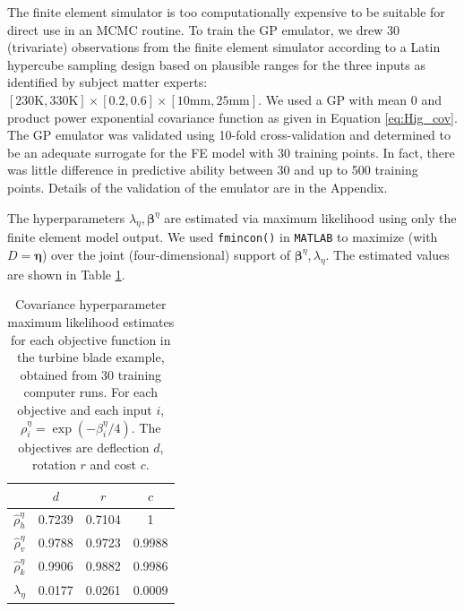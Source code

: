 \documentclass[twocolumn,10pt]{asme2ej}
\begin{document}
The finite element simulator is too computationally expensive to be suitable for direct use in an MCMC routine. 
%
To train the GP emulator, we drew 30 (trivariate) observations from the finite element simulator according to a Latin hypercube sampling design \cite{McKay1979} based on plausible ranges for the three inputs as identified by subject matter experts: $[230\mathrm{K}, 330\mathrm{K}] \times [0.2, 0.6]\times[10\mathrm{mm},25\mathrm{mm}]$.
%
We used a GP with mean 0 and product power exponential covariance function as given in Equation \eqref{eq:Hig_cov}.
%
The GP emulator was validated using 10-fold cross-validation and determined to be an adequate surrogate for the FE model with 30 training points. In fact, there was little difference in predictive ability between 30 and up to 500 training points. Details of the validation of the emulator are in the Appendix.
%
%

%
The hyperparameters $\lambda_\eta,\boldsymbol \beta^\eta$ are estimated %
% 
via maximum likelihood using only the finite element model output.
% 
%
We used \texttt{fmincon()} in \texttt{MATLAB} \cite{MATLAB2017} %
to maximize (with $D=\boldsymbol\eta$) over the joint (four-dimensional) support of $\boldsymbol \beta^\eta,\lambda_\eta$.  
%
The estimated values are shown in Table \ref{table:mles}.
%
\begin{table}[h]
	\renewcommand{\arraystretch}{1.2}
	\begin{center}
		\begin{tabular}{|c|c|c|c|}
			\hline 
			& $d$ & $r$ & $c$ \\ 
			\hline 
			$\hat\rho^\eta_h$	&0.7239 & 0.7104  & 1 \\ 
			\hline 
			$\hat\rho^\eta_v$	&0.9788&  0.9723  & 0.9988 \\ 
			\hline 
			$\hat\rho^\eta_k$	& 0.9906 &0.9882  & 0.9986 \\ 
			\hline 
			$\lambda_\eta$	& 0.0177  & 0.0261 & 0.0009 \\ 
			\hline 
		\end{tabular} 
	\end{center}
	\caption{Covariance hyperparameter maximum likelihood estimates for each objective function in the turbine blade example, obtained from 30 training computer runs. For each objective and each input $i$, $\rho_i^\eta = \exp(-\beta^\eta_i/4)$. The objectives are deflection $d$, rotation $r$ and cost $c$.}
	\label{table:mles}
\end{table}
%
\end{document}
